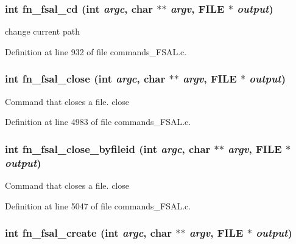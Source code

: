 \subsubsection[{fn\_\-fsal\_\-cd}]{\setlength{\rightskip}{0pt plus 5cm}int fn\_\-fsal\_\-cd (int {\em argc}, \/  char $\ast$$\ast$ {\em argv}, \/  FILE $\ast$ {\em output})}\label{commands__FSAL_8c_1e383e905f534a477fa6002c8344114c}


change current path 

Definition at line 932 of file commands\_\-FSAL.c.
\subsubsection[{fn\_\-fsal\_\-close}]{\setlength{\rightskip}{0pt plus 5cm}int fn\_\-fsal\_\-close (int {\em argc}, \/  char $\ast$$\ast$ {\em argv}, \/  FILE $\ast$ {\em output})}\label{commands__FSAL_8c_1dfe4ba6cf12309c66972b4beb736f49}


Command that closes a file. close 

Definition at line 4983 of file commands\_\-FSAL.c.
\subsubsection[{fn\_\-fsal\_\-close\_\-byfileid}]{\setlength{\rightskip}{0pt plus 5cm}int fn\_\-fsal\_\-close\_\-byfileid (int {\em argc}, \/  char $\ast$$\ast$ {\em argv}, \/  FILE $\ast$ {\em output})}\label{commands__FSAL_8c_dd966799be6a18249b7fa33d65d49ccf}


Command that closes a file. close 

Definition at line 5047 of file commands\_\-FSAL.c.
\subsubsection[{fn\_\-fsal\_\-create}]{\setlength{\rightskip}{0pt plus 5cm}int fn\_\-fsal\_\-create (int {\em argc}, \/  char $\ast$$\ast$ {\em argv}, \/  FILE $\ast$ {\em output})}\label{commands__FSAL_8c_3bce309b30ce91cedd92062521d09b4d}


